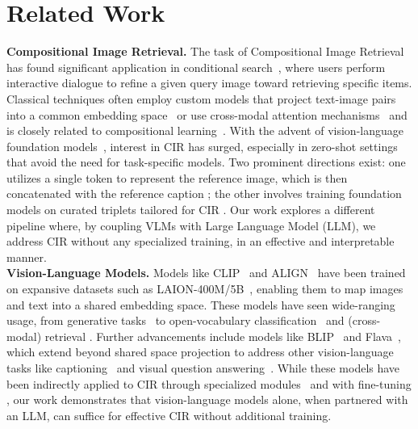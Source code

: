 \documentclass{article} \usepackage{iclr2024_conference,times}
\begin{document}
\section{Related Work}
\textbf{Compositional Image Retrieval.} 
The task of Compositional Image Retrieval has found significant application in conditional search~\citep{guo2019fashion,fashion200k,tirg}, where users perform interactive dialogue to refine a given query image toward retrieving specific items. Classical techniques often employ custom models that project text-image pairs into a common embedding space~\citep{tirg,combiner,chen2020image,chen2020learning,lee2021cosmo,anwaar2021compositional} or use cross-modal attention mechanisms~\citep{artemis} and is closely related to compositional learning~\citep{redwine,compcos,kgsp}. With the advent of vision-language foundation models~\citep{bommasani2021opportunities,clip,align}, interest in CIR has surged, especially in zero-shot settings that avoid the need for task-specific models. Two prominent directions exist: one utilizes a single token to represent the reference image, which is then concatenated with the reference caption \citep{pic2word,searle}; the other involves training foundation models on curated triplets tailored for CIR \citep{liu2023zeroshot,compodiff,ventura2023covr,levy2023data}. Our work explores a different pipeline where, by coupling VLMs with Large Language Model (LLM), we address CIR without any specialized training, in an effective and interpretable manner.\vspace{5pt}\\
\textbf{Vision-Language Models.} Models like CLIP~\citep{clip} and ALIGN~\citep{align} have been trained on expansive datasets such as LAION-400M/5B~\citep{laion400m,laion5b}, enabling them to map images and text into a shared embedding space. These models have seen wide-ranging usage, from generative tasks~\citep{rombach2022stablediffusion,dall-e2,makeascene,liu2022compositional,chefer2023attendandexcite,karthik2023if} to open-vocabulary classification~\citep{clip,openclip,menon2023visual,pratt2023does,udandarao2023susx,roth2023waffling} and (cross-modal) retrieval \citep{Bogolin_2022_CVPR,bain2022clip,langguidance,wu2023cap4video}. 
Further advancements include models like BLIP~\citep{blip,blip2} and Flava~\citep{flava}, which extend beyond shared space projection to address other vision-language tasks like captioning~\citep{vinyals2016show} and visual question answering~\citep{antol2015vqa}. While these models have been indirectly applied to CIR through specialized {modules}~\citep{tirg,combiner,artemis} and with fine-tuning \citep{compodiff}, our work demonstrates that vision-language models alone, when partnered with an LLM, can suffice for effective CIR without additional training.
\end{document}
